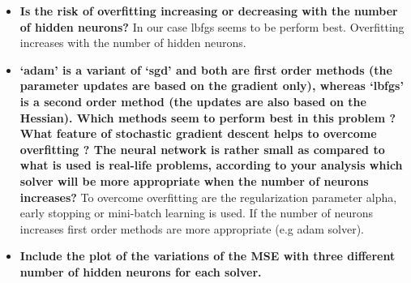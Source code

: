 \documentclass[a4paper]{article}
\begin{document}
\begin{enumerate}[label=(\alph*)]
\begin{itemize}
\item \textbf{Is the risk of overfitting increasing or decreasing with the number of hidden neurons?}
\newline \newline
In our case lbfgs seems to be perform best.
\newline Overfitting increases with the number of hidden neurons.

\newpage

\item \textbf{‘adam’ is a variant of ‘sgd’ and both are first order methods (the parameter updates are based on the gradient only), whereas ‘lbfgs’ is a second order method (the updates are also based on the Hessian). Which methods seem to perform best in this problem ? What feature of stochastic gradient descent helps to overcome overfitting ? The neural network is rather small as compared to what is used is real-life problems, according to your analysis which solver will be more appropriate when the number of neurons increases?}
\newline \newline
To overcome overfitting are the regularization parameter alpha, early stopping or mini-batch learning is used.
If the number of neurons increases first order methods are more appropriate (e.g adam solver). \\

\item \textbf{Include the plot of the variations of the MSE with three different number of hidden neurons for each solver.}


\end{itemize}
\end{enumerate}
\end{document}
